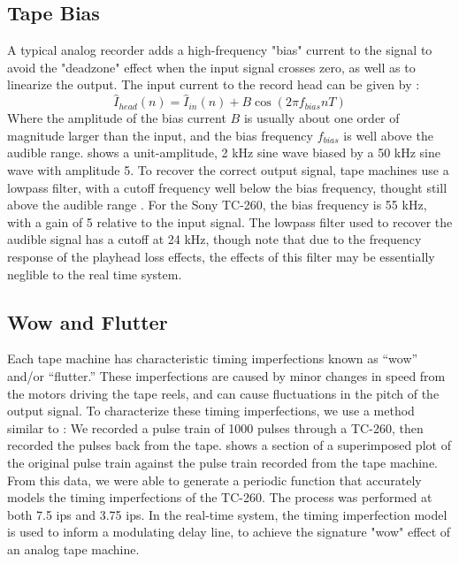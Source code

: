 \documentclass[twoside,a4paper]{article}
\begin{document}
\subsection{Tape Bias}
A typical analog recorder adds a high-frequency "bias"
current to the signal to avoid the "deadzone" effect when the input signal
crosses zero, as well as to linearize the output. The input
current to the record head can be given by
\cite{Camras:1987:MRH:27189}:
\begin{equation}
    \hat{I}_{head}(n) = \hat{I}_{in}(n) + B \cos(2 \pi f_{bias} n T)
\end{equation}
%
Where the amplitude of the bias current $B$ is usually
about one order of magnitude larger than the input,
and the bias frequency $f_{bias}$ is well above the
audible range.  shows a unit-amplitude,
2 kHz sine wave biased by a 50 kHz sine wave with amplitude 5.
To recover the correct output signal, tape machines use a
lowpass filter, with a cutoff frequency well below the bias
frequency, thought still above the audible range \cite{Kadis}.
\newline\newline
For the Sony TC-260, the bias frequency is 55 kHz, with a gain
of 5 relative to the input signal. The lowpass filter used to recover
the audible signal has a cutoff at 24 kHz, though note that due to
the frequency response of the playhead loss effects, the effects
of this filter may be essentially neglible to the real time system.
\cite{RefManual}

\subsection{Wow and Flutter}
Each tape machine has characteristic timing imperfections
known as ``wow'' and/or ``flutter.'' These imperfections
are caused by minor changes in speed from the motors
driving the tape reels, and can cause fluctuations in
the pitch of the output signal. To characterize these
timing imperfections, we use a method similar to \cite{tapeDelay}:
We recorded a pulse train of 1000 pulses through a TC-260,
then recorded the pulses back from the tape. 
shows a section of a superimposed plot of the original
pulse train against the pulse train recorded from the tape
machine. From this data, we were able to generate a periodic
function that accurately models the timing imperfections of
the TC-260. The process was performed at both 7.5 ips and 3.75
ips. In the real-time system, the timing imperfection model
is used to inform a modulating delay line, to achieve the
signature "wow" effect of an analog tape machine.
\end{document}

